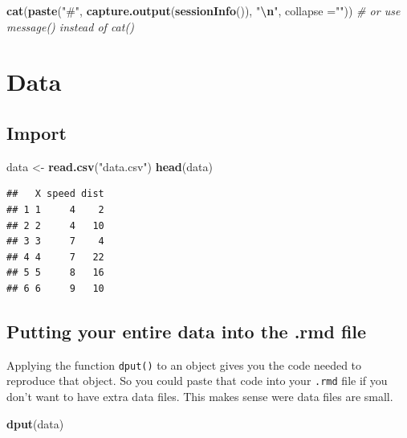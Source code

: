 \documentclass[
  12pt,
]{article}
\newenvironment{Shaded}{\begin{snugshade}}{\end{snugshade}}
\newcommand{\AttributeTok}[1]{\textcolor[rgb]{0.13,0.29,0.53}{#1}}
\newcommand{\CommentTok}[1]{\textcolor[rgb]{0.56,0.35,0.01}{\textit{#1}}}
\newcommand{\FunctionTok}[1]{\textcolor[rgb]{0.13,0.29,0.53}{\textbf{#1}}}
\newcommand{\NormalTok}[1]{#1}
\newcommand{\OtherTok}[1]{\textcolor[rgb]{0.56,0.35,0.01}{#1}}
\newcommand{\SpecialCharTok}[1]{\textcolor[rgb]{0.81,0.36,0.00}{\textbf{#1}}}
\newcommand{\StringTok}[1]{\textcolor[rgb]{0.31,0.60,0.02}{#1}}
\begin{document}
\begin{Shaded}
\begin{Highlighting}[]
\FunctionTok{cat}\NormalTok{(}\FunctionTok{paste}\NormalTok{(}\StringTok{"\#"}\NormalTok{, }\FunctionTok{capture.output}\NormalTok{(}\FunctionTok{sessionInfo}\NormalTok{()), }\StringTok{"}\SpecialCharTok{\textbackslash{}n}\StringTok{"}\NormalTok{, }\AttributeTok{collapse =}\StringTok{""}\NormalTok{)) }
  \CommentTok{\# or use message() instead of cat()}
\end{Highlighting}
\end{Shaded}

\hypertarget{data}{%
\section{Data}\label{data}}

\hypertarget{import}{%
\subsection{Import}\label{import}}

\begin{Shaded}
\begin{Highlighting}[]
\NormalTok{data }\OtherTok{\textless{}{-}} \FunctionTok{read.csv}\NormalTok{(}\StringTok{"data.csv"}\NormalTok{)}
\FunctionTok{head}\NormalTok{(data)}
\end{Highlighting}
\end{Shaded}

\begin{verbatim}
##   X speed dist
## 1 1     4    2
## 2 2     4   10
## 3 3     7    4
## 4 4     7   22
## 5 5     8   16
## 6 6     9   10
\end{verbatim}

\hypertarget{putting-your-entire-data-into-the-.rmd-file}{%
\subsection{Putting your entire data into the .rmd
file}\label{putting-your-entire-data-into-the-.rmd-file}}

Applying the function \texttt{dput()} to an object gives you the code
needed to reproduce that object. So you could paste that code into your
\texttt{.rmd} file if you don't want to have extra data files. This
makes sense were data files are small.

\begin{Shaded}
\begin{Highlighting}[]
\FunctionTok{dput}\NormalTok{(data)}
\end{Highlighting}
\end{Shaded}
\end{document}

